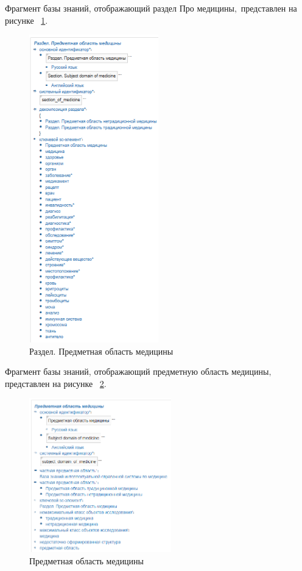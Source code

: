 Фрагмент базы знаний, отображающий  раздел Про медицины$,$ представлен на рисунке
~\ref{fig:sections/section_of_medicine}.
\begin{figure}[H]
	\centering
	\includegraphics[width=0.5\textwidth]{sections/section_of_medicine.png}
	\caption{Раздел. Предметная область медицины}
	\label{fig:sections/section_of_medicine}
\end{figure}
Фрагмент базы знаний, отображающий предметную область медицины$,$ представлен на рисунке
~\ref{fig:sections/subject_domain_of_medicine}.
\begin{figure}[H]
	\centering
	\includegraphics[width=0.55\textwidth]{sections/subject_domain_of_medicine.png}
	\caption{Предметная область медицины}
	\label{fig:sections/subject_domain_of_medicine}
\end{figure}

